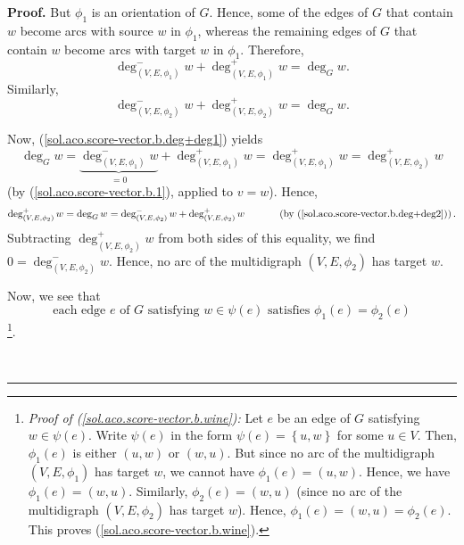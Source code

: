 \documentclass[numbers=enddot,12pt,final,onecolumn,notitlepage]{scrartcl}%
\theoremstyle{definition}
\newenvironment{proof}[1][Proof]{\noindent\textbf{#1.} }{\ \rule{0.5em}{0.5em}}
\begin{document}
\begin{proof}
But $\phi_{1}$ is an orientation of $G$. Hence, some of the edges of $G$ that
contain $w$ become arcs with source $w$ in $\phi_{1}$, whereas the remaining
edges of $G$ that contain $w$ become arcs with target $w$ in $\phi_{1}$.
Therefore,
\begin{equation}
\deg_{\left(  V,E,\phi_{1}\right)  }^{-}w+\deg_{\left(  V,E,\phi_{1}\right)
}^{+}w=\deg_{G}w. \label{sol.aco.score-vector.b.deg+deg1}%
\end{equation}
Similarly,%
\begin{equation}
\deg_{\left(  V,E,\phi_{2}\right)  }^{-}w+\deg_{\left(  V,E,\phi_{2}\right)
}^{+}w=\deg_{G}w. \label{sol.aco.score-vector.b.deg+deg2}%
\end{equation}


Now, (\ref{sol.aco.score-vector.b.deg+deg1}) yields%
\[
\deg_{G}w=\underbrace{\deg_{\left(  V,E,\phi_{1}\right)  }^{-}w}_{=0}%
+\deg_{\left(  V,E,\phi_{1}\right)  }^{+}w=\deg_{\left(  V,E,\phi_{1}\right)
}^{+}w=\deg_{\left(  V,E,\phi_{2}\right)  }^{+}w
\]
(by (\ref{sol.aco.score-vector.b.1}), applied to $v=w$). Hence,%
\[
\deg_{\left(  V,E,\phi_{2}\right)  }^{+}w=\deg_{G}w=\deg_{\left(  V,E,\phi
_{2}\right)  }^{-}w+\deg_{\left(  V,E,\phi_{2}\right)  }^{+}%
w\ \ \ \ \ \ \ \ \ \ \left(  \text{by (\ref{sol.aco.score-vector.b.deg+deg2}%
)}\right)  .
\]
Subtracting $\deg_{\left(  V,E,\phi_{2}\right)  }^{+}w$ from both sides of
this equality, we find $0=\deg_{\left(  V,E,\phi_{2}\right)  }^{-}w$. Hence,
no arc of the multidigraph $\left(  V,E,\phi_{2}\right)  $ has target $w$.

Now, we see that
\begin{equation}
\text{each edge }e\text{ of }G\text{ satisfying }w\in\psi\left(  e\right)
\text{ satisfies }\phi_{1}\left(  e\right)  =\phi_{2}\left(  e\right)
\label{sol.aco.score-vector.b.wine}%
\end{equation}
\footnote{\textit{Proof of (\ref{sol.aco.score-vector.b.wine}):} Let $e$ be an
edge of $G$ satisfying $w\in\psi\left(  e\right)  $. Write $\psi\left(
e\right)  $ in the form $\psi\left(  e\right)  =\left\{  u,w\right\}  $ for
some $u\in V$. Then, $\phi_{1}\left(  e\right)  $ is either $\left(
u,w\right)  $ or $\left(  w,u\right)  $. But since no arc of the multidigraph
$\left(  V,E,\phi_{1}\right)  $ has target $w$, we cannot have $\phi
_{1}\left(  e\right)  =\left(  u,w\right)  $. Hence, we have $\phi_{1}\left(
e\right)  =\left(  w,u\right)  $. Similarly, $\phi_{2}\left(  e\right)
=\left(  w,u\right)  $ (since no arc of the multidigraph $\left(  V,E,\phi
_{2}\right)  $ has target $w$). Hence, $\phi_{1}\left(  e\right)  =\left(
w,u\right)  =\phi_{2}\left(  e\right)  $. This proves
(\ref{sol.aco.score-vector.b.wine}).}.


\end{proof}
\end{document}
